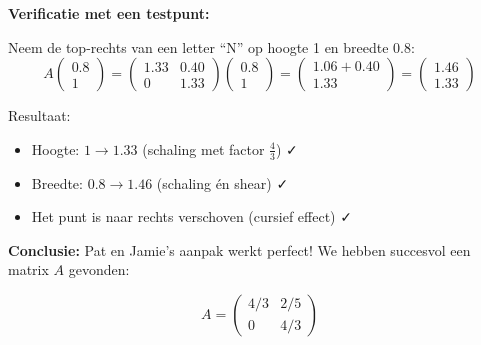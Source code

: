 \documentclass{ximera}
\begin{document}
\begin{freeResponse}
\textbf{Verificatie met een testpunt:}

Neem de top-rechts van een letter ``N'' op hoogte 1 en breedte 0.8:
$$A \begin{pmatrix} 0.8 \\ 1 \end{pmatrix} = \begin{pmatrix} 1.33 & 0.40 \\ 0 & 1.33 \end{pmatrix} \begin{pmatrix} 0.8 \\ 1 \end{pmatrix} = \begin{pmatrix} 1.06 + 0.40 \\ 1.33 \end{pmatrix} = \begin{pmatrix} 1.46 \\ 1.33 \end{pmatrix}$$

Resultaat:
\begin{itemize}
\item Hoogte: $1 \to 1.33$ (schaling met factor $\frac{4}{3}$) ✓
\item Breedte: $0.8 \to 1.46$ (schaling én shear) ✓
\item Het punt is naar rechts verschoven (cursief effect) ✓
\end{itemize}

\textbf{Conclusie:} Pat en Jamie's aanpak werkt perfect! We hebben succesvol een matrix $A$ gevonden:

$$\boxed{A = \begin{pmatrix} 4/3 & 2/5 \\ 0 & 4/3 \end{pmatrix}}$$
\end{freeResponse}
\end{document}
